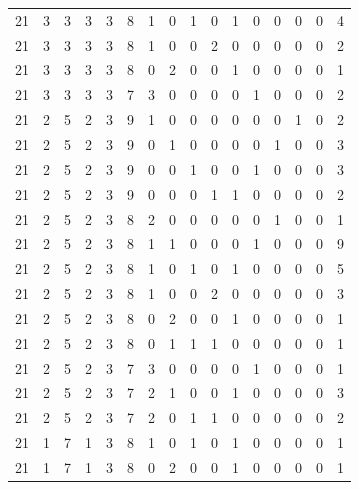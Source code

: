 \begin{appendix}
{\begin{longtable}{lrrrrrrrrrrrrrrr}
    21        & 3  & 3  & 3  & 3  & 8  & 1  & 0  & 1  & 0  & 1  & 0  & 0   & 0   & 0   & 4    \\
    21        & 3  & 3  & 3  & 3  & 8  & 1  & 0  & 0  & 2  & 0  & 0  & 0   & 0   & 0   & 2    \\
    21        & 3  & 3  & 3  & 3  & 8  & 0  & 2  & 0  & 0  & 1  & 0  & 0   & 0   & 0   & 1    \\
    21        & 3  & 3  & 3  & 3  & 7  & 3  & 0  & 0  & 0  & 0  & 1  & 0   & 0   & 0   & 2    \\
    21        & 2  & 5  & 2  & 3  & 9  & 1  & 0  & 0  & 0  & 0  & 0  & 0   & 1   & 0   & 2    \\
    21        & 2  & 5  & 2  & 3  & 9  & 0  & 1  & 0  & 0  & 0  & 0  & 1   & 0   & 0   & 3    \\
    21        & 2  & 5  & 2  & 3  & 9  & 0  & 0  & 1  & 0  & 0  & 1  & 0   & 0   & 0   & 3    \\
    21        & 2  & 5  & 2  & 3  & 9  & 0  & 0  & 0  & 1  & 1  & 0  & 0   & 0   & 0   & 2    \\
    21        & 2  & 5  & 2  & 3  & 8  & 2  & 0  & 0  & 0  & 0  & 0  & 1   & 0   & 0   & 1    \\
    21        & 2  & 5  & 2  & 3  & 8  & 1  & 1  & 0  & 0  & 0  & 1  & 0   & 0   & 0   & 9    \\
    21        & 2  & 5  & 2  & 3  & 8  & 1  & 0  & 1  & 0  & 1  & 0  & 0   & 0   & 0   & 5    \\
    21        & 2  & 5  & 2  & 3  & 8  & 1  & 0  & 0  & 2  & 0  & 0  & 0   & 0   & 0   & 3    \\
    21        & 2  & 5  & 2  & 3  & 8  & 0  & 2  & 0  & 0  & 1  & 0  & 0   & 0   & 0   & 1    \\
    21        & 2  & 5  & 2  & 3  & 8  & 0  & 1  & 1  & 1  & 0  & 0  & 0   & 0   & 0   & 1    \\
    21        & 2  & 5  & 2  & 3  & 7  & 3  & 0  & 0  & 0  & 0  & 1  & 0   & 0   & 0   & 1    \\
    21        & 2  & 5  & 2  & 3  & 7  & 2  & 1  & 0  & 0  & 1  & 0  & 0   & 0   & 0   & 3    \\
    21        & 2  & 5  & 2  & 3  & 7  & 2  & 0  & 1  & 1  & 0  & 0  & 0   & 0   & 0   & 2    \\
    21        & 1  & 7  & 1  & 3  & 8  & 1  & 0  & 1  & 0  & 1  & 0  & 0   & 0   & 0   & 1    \\
    21        & 1  & 7  & 1  & 3  & 8  & 0  & 2  & 0  & 0  & 1  & 0  & 0   & 0   & 0   & 1    \\

\end{longtable}}
\end{appendix}
